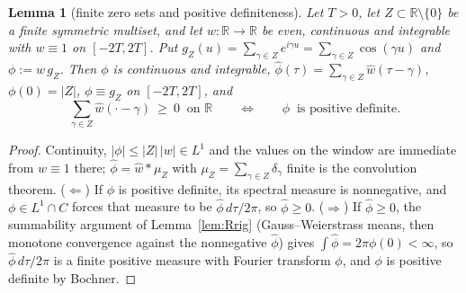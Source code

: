\documentclass[11pt]{amsart}
\newtheorem{lemma}[theorem]{Lemma}
\theoremstyle{definition}
\theoremstyle{remark}
\newcommand{\R}{\mathbb R}
\newcommand{\wh}{\widehat w}
\begin{document}
\begin{lemma}[finite zero sets and positive definiteness]\label{lem:fdict}
Let $T>0$, let $Z\subset\R\setminus\{0\}$ be a finite symmetric multiset, and let $w:\R\to\R$ be
even, continuous and integrable with $w\equiv1$ on $[-2T,2T]$. Put
$g_Z(u)=\sum_{\gamma\in Z}e^{i\gamma u}=\sum_{\gamma\in Z}\cos(\gamma u)$ and $\phi:=w\,g_Z$. Then
$\phi$ is continuous and integrable, $\widehat\phi(\tau)=\sum_{\gamma\in Z}\wh(\tau-\gamma)$,
$\phi(0)=|Z|$, $\phi\equiv g_Z$ on $[-2T,2T]$, and
\[
\sum_{\gamma\in Z}\wh(\cdot-\gamma)\ \ge\ 0\ \text{ on }\R
\qquad\Longleftrightarrow\qquad
\phi\ \text{ is positive definite.}
\]
\end{lemma}
\begin{proof}
Continuity, $|\phi|\le|Z|\,|w|\in L^1$ and the values on the window are immediate from $w\equiv1$
there; $\widehat\phi=\wh*\mu_Z$ with $\mu_Z=\sum_{\gamma\in Z}\delta_\gamma$ finite is the
convolution theorem. ($\Leftarrow$) If $\phi$ is positive definite, its spectral measure is
nonnegative, and $\phi\in L^1\cap C$ forces that measure to be $\widehat\phi\,d\tau/2\pi$, so
$\widehat\phi\ge0$. ($\Rightarrow$) If $\widehat\phi\ge0$, the summability argument of
Lemma~\ref{lem:Rrig} (Gauss--Weierstrass means, then monotone convergence against the nonnegative
$\widehat\phi$) gives $\int\widehat\phi=2\pi\phi(0)<\infty$, so $\widehat\phi\,d\tau/2\pi$ is a
finite positive measure with Fourier transform $\phi$, and $\phi$ is positive definite by Bochner.
\end{proof}
\end{document}
